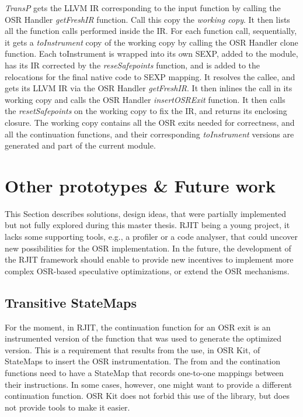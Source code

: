\textit{TransP} gets the LLVM IR corresponding to the input function by calling the OSR Handler \textit{getFreshIR} function.
Call this copy the \textit{working copy}.
It then lists all the function calls performed inside the IR.
For each function call, sequentially, it gets a \textit{toInstrument} copy of the working copy by calling the OSR Handler clone function.
Each toInstrument is wrapped into its own SEXP, added to the module, has its IR corrected by the \textit{reseSafepoints} function, and is added to the relocations for the final native code to SEXP mapping.
It resolves the callee, and gets its LLVM IR via the OSR Handler \textit{getFreshIR}.
It then inlines the call in its working copy and calls the OSR Handler \textit{insertOSRExit} function.
It then calls the \textit{resetSafepoints} on the working copy to fix the IR, and returns its enclosing closure.
The working copy contains all the OSR exits needed for correctness, and all the continuation functions, and their corresponding \textit{toInstrument} versions are generated and part of the current module.\\


\section{Other prototypes \& Future work}
This Section describes solutions, design ideas, that were partially implemented but not fully explored during this master thesis.
RJIT being a young project, it lacks some supporting tools, e.g., a profiler or a code analyser, that could uncover new possibilities for the OSR implementation.
In the future, the development of the RJIT framework should enable to provide new incentives to implement more complex OSR-based speculative optimizations, or extend the OSR mechanisms.\\

\subsection{Transitive StateMaps}
For the moment, in RJIT, the continuation function for an OSR exit is an instrumented version of the function that was used to generate the optimized version.
This is a requirement that results from the use, in OSR Kit\cite{OSRKit}, of StateMaps to insert the OSR instrumentation.
The from and the contination functions need to have a StateMap that records one-to-one mappings between their instructions.
In some cases, however, one might want to provide a different continuation function.
OSR Kit does not forbid this use of the library, but does not provide tools to make it easier.\\  


